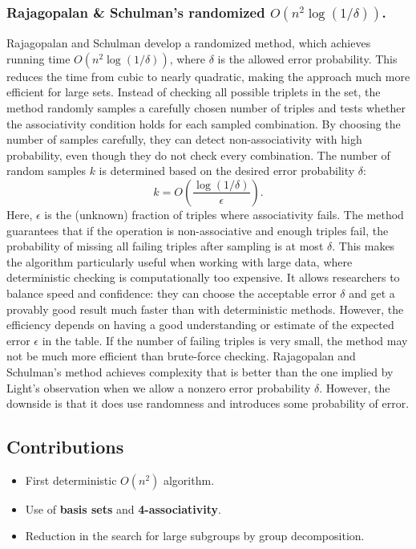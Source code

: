 \documentclass[sigconf]{acmart}
\begin{document}
\subsubsection{Rajagopalan \& Schulman's randomized \( O(n^2 \log(1/\delta)) \).}
Rajagopalan and Schulman \cite{548520} develop a randomized method, which achieves running time $O(n^2 \log(1/\delta))$, where $\delta$ is the allowed error probability. This reduces the time from cubic to nearly quadratic, making the approach much more efficient for large sets.
Instead of checking all possible triplets in the set, the method randomly samples a carefully chosen number of triples and tests whether the associativity condition holds for each sampled combination. By choosing the number of samples carefully, they can detect non-associativity with high probability, even though they do not check every combination.
The number of random samples $k$ is determined based on the desired error probability $\delta$:
\[k = O\left(\frac{\log(1/\delta)}{\epsilon}\right).\]
Here, $\epsilon$ is the (unknown) fraction of triples where associativity fails. 
The method guarantees that if the operation is non-associative and enough triples fail, the probability of missing all failing triples after sampling is at most $\delta$. This makes the algorithm particularly useful when working with large data, where deterministic checking is computationally too expensive. It allows researchers to balance speed and confidence: they can choose the acceptable error $\delta$ and get a provably good result much faster than with deterministic methods.
However, the efficiency depends on having a good understanding or estimate of the expected error $\epsilon$ in the table. If the number of failing triples is very small, the method may not be much more efficient than brute-force checking.
Rajagopalan and Schulman’s method achieves complexity that is better than the one implied by Light’s observation when we allow a nonzero error probability $\delta$. However, the downside is that it does use randomness and introduces some probability of error.
    

\subsection{Contributions}
\begin{itemize}
    \item First deterministic \( O(n^2) \) algorithm.
    \item Use of \textbf{basis sets} and \textbf{4-associativity}.
    \item Reduction in the search for large subgroups by group decomposition.
\end{itemize}
\end{document}

